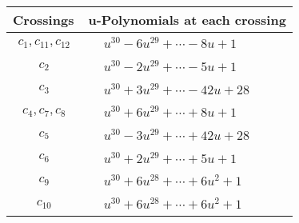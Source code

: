 \documentclass[1p]{elsarticle_modified}
\theoremstyle{definition}
\begin{document}
\begin{tabular}{m{50pt}|m{274pt}}
Crossings & \hspace{64pt}u-Polynomials at each crossing \\
\hline $$\begin{aligned}c_{1},c_{11},c_{12}\end{aligned}$$&$\begin{aligned}
&u^{30}-6 u^{29}+\cdots-8 u+1
\end{aligned}$\\
\hline $$\begin{aligned}c_{2}\end{aligned}$$&$\begin{aligned}
&u^{30}-2 u^{29}+\cdots-5 u+1
\end{aligned}$\\
\hline $$\begin{aligned}c_{3}\end{aligned}$$&$\begin{aligned}
&u^{30}+3 u^{29}+\cdots-42 u+28
\end{aligned}$\\
\hline $$\begin{aligned}c_{4},c_{7},c_{8}\end{aligned}$$&$\begin{aligned}
&u^{30}+6 u^{29}+\cdots+8 u+1
\end{aligned}$\\
\hline $$\begin{aligned}c_{5}\end{aligned}$$&$\begin{aligned}
&u^{30}-3 u^{29}+\cdots+42 u+28
\end{aligned}$\\
\hline $$\begin{aligned}c_{6}\end{aligned}$$&$\begin{aligned}
&u^{30}+2 u^{29}+\cdots+5 u+1
\end{aligned}$\\
\hline $$\begin{aligned}c_{9}\end{aligned}$$&$\begin{aligned}
&u^{30}+6 u^{28}+\cdots+6 u^2+1
\end{aligned}$\\
\hline $$\begin{aligned}c_{10}\end{aligned}$$&$\begin{aligned}
&u^{30}+6 u^{28}+\cdots+6 u^2+1
\end{aligned}$\\
\hline
\end{tabular}\\~\\
\end{document}
